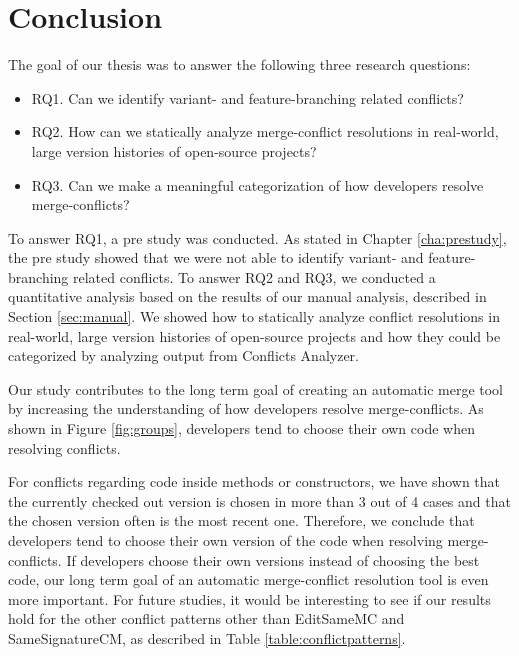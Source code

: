 \chapter{Conclusion}
The goal of our thesis was to answer the following three research questions:
\begin{itemize}
\item RQ1. Can we identify variant- and feature-branching related conflicts?
\item RQ2. How can we statically analyze merge-conflict resolutions in real-world, large version histories of open-source projects?
\item RQ3. Can we make a meaningful categorization of how developers resolve merge-conflicts?
\end{itemize}

To answer RQ1, a pre study was conducted. As stated in Chapter \ref{cha:prestudy}, the pre study showed that we were not able to identify variant- and feature-branching related conflicts. To answer RQ2 and RQ3, we conducted a quantitative analysis based on the results of our manual analysis, described in Section \ref{sec:manual}. We showed how to statically analyze conflict resolutions in real-world, large version histories of open-source projects and how they could be categorized by analyzing output from Conflicts Analyzer.

Our study contributes to the long term goal of creating an automatic merge tool by increasing the understanding of how developers resolve merge-conflicts. As shown in Figure \ref{fig:groups}, developers tend to choose their own code when resolving conflicts.

For conflicts regarding code inside methods or constructors, we have shown that the currently checked out version is chosen in more than 3 out of 4 cases and that the chosen version often is the most recent one. Therefore, we conclude that developers tend to choose their own version of the code when resolving merge-conflicts. If developers choose their own versions instead of choosing the best code, our long term goal of an automatic merge-conflict resolution tool is even more important. For future studies, it would be interesting to see if our results hold for the other conflict patterns other than EditSameMC and SameSignatureCM, as described in Table \ref{table:conflictpatterns}.

